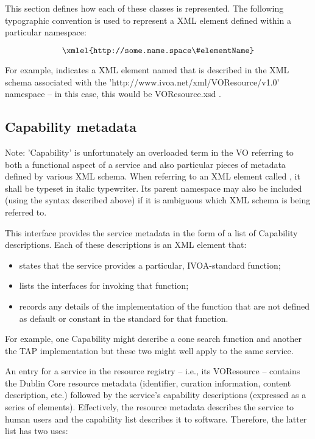 \documentclass[11pt,letter]{ivoa}
\begin{document}
This section defines how each of these classes is represented. The
following typographic convention is used to represent a XML element
defined within a particular namespace:

$$\hbox{\xmlel{http://some.name.space\#elementName}}$$

For example, 
indicates a XML element named  that is described in the
XML schema associated with the 'http://www.ivoa.net/xml/VOResource/v1.0'
namespace -- in this case, this would be VOResource.xsd
\citep{2018ivoa.spec.0625P}. 

\subsection{Capability metadata}

Note:
    'Capability' is unfortunately an overloaded term in the VO referring
    to both a functional aspect of a service and also particular pieces
    of metadata defined by various XML schema. When referring to an XML
    element called , it shall be typeset in italic
    typewriter. Its parent namespace may also be included (using the
    syntax described above) if it is ambiguous which XML schema is being
    referred to. 
    
This interface provides the service metadata in the form of a list of
Capability descriptions. Each of these descriptions is an XML element
that:

\begin{itemize}
\item states that the service provides a particular, IVOA-standard function;
\item lists the interfaces for invoking that function;
\item records any details of the implementation of the function that are
not defined as default or constant in the standard for that function. 
\end{itemize}

For example, one Capability might describe a cone search function and
another the TAP implementation but these two might well apply to the
same service.

An entry for a service in the resource registry -- i.e., its VOResource --
contains the Dublin Core resource metadata (identifier, curation
information, content description, etc.) followed by the service's
capability descriptions (expressed as a series of
elements). Effectively, the resource metadata describes the service to
human users and the capability list describes it to software. Therefore,
the latter list has two uses:
\end{document}

